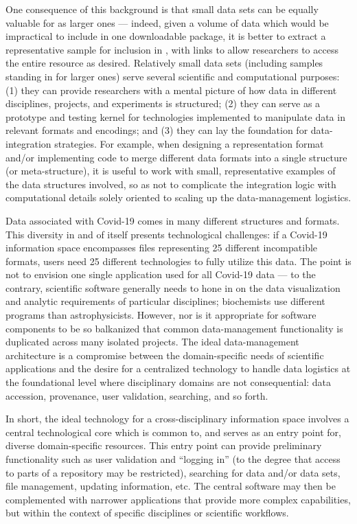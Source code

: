 \documentclass[11pt,letterpaper]{article}
\newcommand{\textscc}[1]{{\color{orr!35!black}{{%
						\fontfamily{Cabin-TLF}\fontseries{b}\selectfont{\textsc{\scriptsize{#1}}}}}}}
\newcommand{\AcronymText}[1]{{\textscc{#1}}}
\newcommand{\CRtwo}{{\resizebox{!}{7pt}{\AcronymText{CR2}}}}
\newcommand{\p}[1]{

\vspace{.75em}#1}
\newcommand{\q}[1]{{\fontfamily{qcr}\selectfont ``}#1{\fontfamily{qcr}\selectfont ''}}
\begin{document}
{\p{One consequence of this background is that small 
data sets can be equally valuable for \CRtwo{} as 
larger ones --- indeed, given a volume of data 
which would be impractical to include in one 
downloadable package, it is better to extract a 
representative sample for inclusion in \CRtwo{}, 
with links to allow researchers to access the entire 
resource as desired.  Relatively small data 
sets (including samples standing in for larger 
ones) serve several scientific and computational 
purposes: (1) they can provide researchers 
with a mental picture of how data in different 
disciplines, projects, and experiments is structured; 
(2) they can serve as a prototype and testing 
kernel for technologies implemented to manipulate 
data in relevant formats and encodings; and 
(3) they can lay the foundation for data-integration 
strategies.  For example, when designing a 
representation format and/or implementing code 
to merge different data formats into a single 
structure (or meta-structure), it is useful 
to work with small, representative examples 
of the data structures involved, so as not 
to complicate the integration logic with 
computational details solely oriented to 
scaling up the data-management logistics.}

\p{Data associated with Covid-19 comes in many 
different structures and formats.  This diversity 
in and of itself presents technological challenges: 
if a Covid-19 information space encompasses 
files representing 25 different incompatible 
formats, users need 25 different technologies 
to fully utilize this data.  The point is not 
to envision one single application used for 
all Covid-19 data --- to the contrary, 
scientific software generally needs to hone in 
on the data visualization and analytic 
requirements of particular disciplines; 
biochemists use different programs than 
astrophysicists.  However, nor is it 
appropriate for software components to be so 
balkanized that common data-management 
functionality is duplicated across 
many isolated projects.  The ideal data-management 
architecture is a compromise between the 
domain-specific needs of scientific applications 
and the desire for a centralized technology 
to handle data logistics at the foundational 
level where disciplinary domains are not 
consequential: data accession, provenance, 
user validation, searching, and so forth.}

\p{In short, the ideal technology for a 
cross-disciplinary information space involves a 
central technological core which is 
common to, and serves as an entry point 
for, diverse domain-specific resources.  
This entry point can provide preliminary 
functionality such as user validation and 
\q{logging in} (to the degree that access 
to parts of a repository may be restricted), 
searching for data and/or data sets, file 
management, updating information, etc.  
The central software may then be complemented 
with narrower applications that provide 
more complex capabilities, but within the 
context of specific disciplines or scientific 
workflows.}

}
\end{document}
